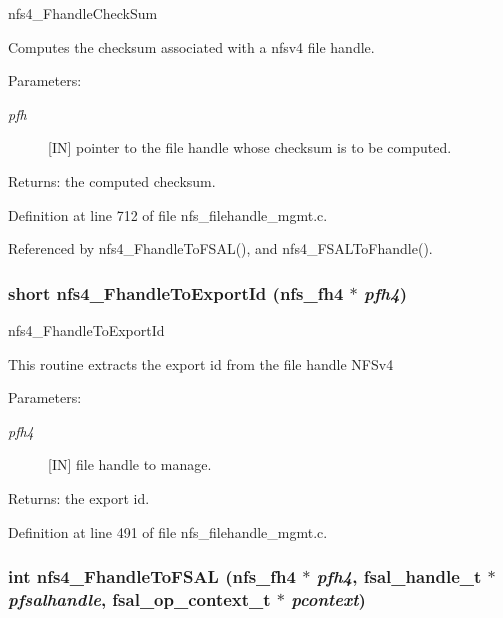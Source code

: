 nfs4\_\-Fhandle\-Check\-Sum

Computes the checksum associated with a nfsv4 file handle.

\begin{Desc}
\item[Parameters:]
\begin{description}
\item[{\em pfh}][IN] pointer to the file handle whose checksum is to be computed.\end{description}
\end{Desc}
\begin{Desc}
\item[Returns:]the computed checksum. \end{Desc}


Definition at line 712 of file nfs\_\-filehandle\_\-mgmt.c.

Referenced by nfs4\_\-Fhandle\-To\-FSAL(), and nfs4\_\-FSALTo\-Fhandle().
\subsubsection{\setlength{\rightskip}{0pt plus 5cm}short nfs4\_\-Fhandle\-To\-Export\-Id (nfs\_\-fh4 $\ast$ {\em pfh4})}\label{nfs__filehandle__mgmt_8c_a8}


nfs4\_\-Fhandle\-To\-Export\-Id

This routine extracts the export id from the file handle NFSv4

\begin{Desc}
\item[Parameters:]
\begin{description}
\item[{\em pfh4}][IN] file handle to manage.\end{description}
\end{Desc}
\begin{Desc}
\item[Returns:]the export id. \end{Desc}


Definition at line 491 of file nfs\_\-filehandle\_\-mgmt.c.
\subsubsection{\setlength{\rightskip}{0pt plus 5cm}int nfs4\_\-Fhandle\-To\-FSAL (nfs\_\-fh4 $\ast$ {\em pfh4}, fsal\_\-handle\_\-t $\ast$ {\em pfsalhandle}, fsal\_\-op\_\-context\_\-t $\ast$ {\em pcontext})}\label{nfs__filehandle__mgmt_8c_a2}



